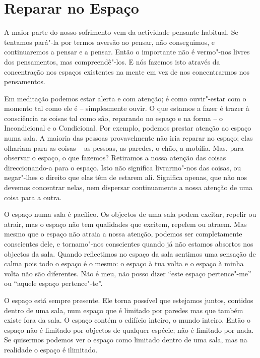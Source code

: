 \chapter{Reparar no Espaço}

A maior parte do nosso sofrimento vem da actividade pensante habitual.
 Se tentamos pará"-la por termos aversão ao pensar, não conseguimos, e
continuaremos a pensar e a pensar. Então o importante não é vermo"-nos
livres dos pensamentos, mas compreendê"-los. E nós fazemos isto através
da concentração nos espaços existentes na mente em vez de nos
concentrarmos nos pensamentos.

Em meditação podemos estar alerta e com atenção; é como ouvir"-estar com
o momento tal como ele é -- simplesmente ouvir. O que estamos a fazer é
trazer à consciência as coisas tal como são, reparando no espaço e na
forma -- o Incondicional e o Condicional. Por exemplo, podemos prestar
atenção ao espaço numa sala. A maioria das pessoas provavelmente não
iria reparar no espaço; elas olhariam para as coisas -- as pessoas, as
paredes, o chão, a mobília. Mas, para observar o espaço, o que fazemos?
Retiramos a nossa atenção das coisas direccionando-a para o espaço. Isto
não significa livrarmo"-nos das coisas, ou negar"-lhes o direito que elas
têm de estarem ali. Significa apenas, que não nos devemos concentrar
nelas, nem dispersar continuamente a nossa atenção de uma coisa para a
outra.

O espaço numa sala é pacífico. Os objectos de uma sala podem excitar,
repelir ou atrair, mas o espaço não tem qualidades que excitem, repelem
ou atraem. Mas mesmo que o espaço não atraia a nossa atenção, podemos
ser completamente conscientes dele, e tornamo"-nos conscientes quando já
não estamos absortos nos objectos da sala. Quando reflectimos no espaço
da sala sentimos uma sensação de calma pois todo o espaço é o mesmo: o
espaço à tua volta e o espaço à minha volta não são diferentes. Não é
meu, não posso dizer ``este espaço pertence"-me'' ou ``aquele espaço
pertence"-te''.

O espaço está sempre presente. Ele torna possível que estejamos juntos,
contidos dentro de uma sala, num espaço que é limitado por paredes mas
que também existe fora da sala. O espaço contém o edifício inteiro, o
mundo inteiro. Então o espaço não é limitado por objectos de qualquer
espécie; não é limitado por nada. Se quisermos podemos ver o espaço como
limitado dentro de uma sala, mas na realidade o espaço é ilimitado.

